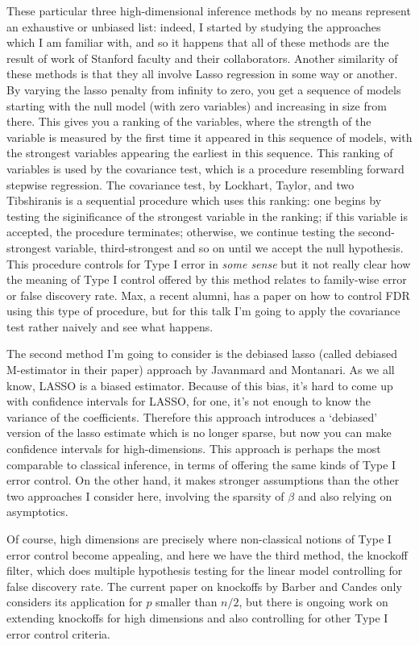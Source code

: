 \documentclass[11pt]{article}
\begin{document}
These particular three high-dimensional inference methods by no means
represent an exhaustive or unbiased list: indeed, I started by
studying the approaches which I am familiar with, and so it happens
that all of these methods are the result of work of Stanford faculty
and their collaborators.  Another similarity of these methods is that
they all involve Lasso regression in some way or another.  By varying
the lasso penalty from infinity to zero, you get a sequence of models
starting with the null model (with zero variables) and increasing in
size from there.  This gives you a ranking of the variables, where the
strength of the variable is measured by the first time it appeared in
this sequence of models, with the strongest variables appearing the
earliest in this sequence.  This ranking of variables is used by the
covariance test, which is a procedure resembling forward stepwise
regression.  The covariance test, by Lockhart, Taylor, and two
Tibshiranis is a sequential procedure which uses this ranking: one
begins by testing the siginificance of the strongest variable in the
ranking; if this variable is accepted, the procedure terminates;
otherwise, we continue testing the second-strongest variable,
third-strongest and so on until we accept the null hypothesis.  This
procedure controls for Type I error in \emph{some sense} but it not
really clear how the meaning of Type I control offered by this method
relates to family-wise error or false discovery rate.  Max, a recent
alumni, has a paper on how to control FDR using this type of
procedure, but for this talk I'm going to apply the covariance test
rather naively and see what happens.

The second method I'm going to consider is the debiased lasso (called
debiased M-estimator in their paper) approach by Javanmard and
Montanari.  As we all know, LASSO is a biased estimator.  Because of
this bias, it's hard to come up with confidence intervals for LASSO,
for one, it's not enough to know the variance of the coefficients.
Therefore this approach introduces a `debiased' version of the lasso
estimate which is no longer sparse, but now you can make confidence
intervals for high-dimensions.  This approach is perhaps the most
comparable to classical inference, in terms of offering the same kinds
of Type I error control.  On the other hand, it makes stronger
assumptions than the other two approaches I consider here, involving
the sparsity of $\beta$ and also relying on asymptotics.

Of course, high dimensions are precisely where non-classical notions
of Type I error control become appealing, and here we have the third
method, the knockoff filter, which does multiple hypothesis testing
for the linear model controlling for false discovery rate.  The
current paper on knockoffs by Barber and Candes only considers its
application for $p$ smaller than $n/2$, but there is ongoing work on
extending knockoffs for high dimensions and also controlling for other
Type I error control criteria.
\end{document}
